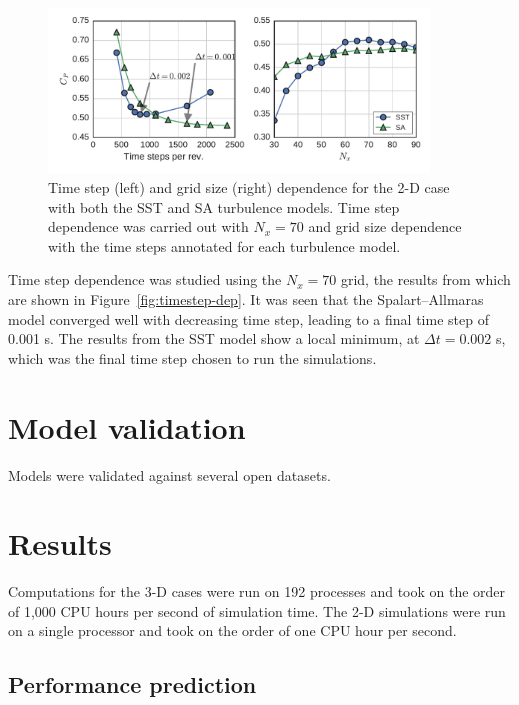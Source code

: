 \documentclass[aip,graphicx]{revtex4-1}
\begin{document}
\begin{figure}[ht]
    \centering
    
    \includegraphics[width=0.9\textwidth]{figures/verification} 
    
    \caption{Time step (left) and grid size (right) dependence for the 2-D case
        with both the SST and SA turbulence models. Time step dependence was carried
        out with $N_x=70$ and grid size dependence with the time steps annotated for
        each turbulence model.}
    
    \label{fig:spatial-grid-dep}
\end{figure}

Time step dependence was studied using the $N_x=70$ grid, the results from which
are shown in Figure~\ref{fig:timestep-dep}. It was seen that the
Spalart--Allmaras model converged well with decreasing time step, leading to a
final time step of 0.001 s. The results from the SST model show a local minimum,
at $\Delta t = 0.002$ s, which was the final time step chosen to run the
simulations.


\section{Model validation}

Models were validated against several open datasets.


\section{Results}

Computations for the 3-D cases were run on 192 processes and took on the order
of 1,000 CPU hours per second of simulation time. The 2-D simulations were run
on a single processor and took on the order of one CPU hour per second.


\subsection{Performance prediction}
\end{document}
